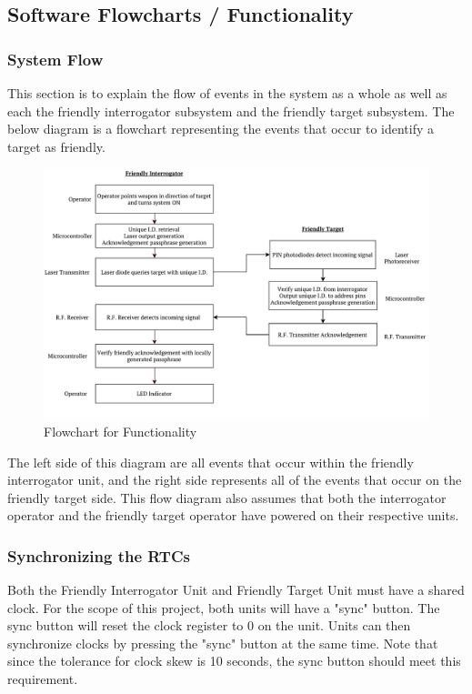 \documentclass[letterpaper,10pt]{article}
\begin{document}
\begin{spacing}{1.15}
\subsection{Software Flowcharts / Functionality} \label{section-software}
\subsubsection{System Flow}
This section is to explain the flow of events in the system as a whole as well as each the friendly interrogator subsystem and the friendly target subsystem. The below diagram is a flowchart representing the events that occur to identify a target as friendly.

\begin{figure} [H]
	\centering
	\includegraphics[scale=0.55]{Functionality_Flowchart.pdf}
	\caption{Flowchart for Functionality\label{fig:circuit-schematic}}
\end{figure}

The left side of this diagram are all events that occur within the friendly interrogator unit, and the right side represents all of the events that occur on the friendly target side. This flow diagram also assumes that both the interrogator operator and the friendly target operator have powered on their respective units.

\subsubsection{Synchronizing the RTCs}
Both the Friendly Interrogator Unit and Friendly Target Unit must have a shared clock. For the scope of this project, both units will have a "sync" button. The sync button will reset the clock register to 0 on the unit. Units can then synchronize clocks by pressing the "sync" button at the same time. Note that since the tolerance for clock skew is 10 seconds, the sync button should meet this requirement. 


\end{spacing}
\end{document}

